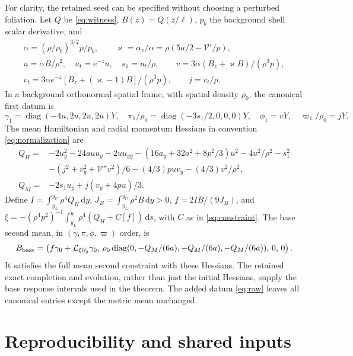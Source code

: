 \documentclass[11pt]{article}
\newcommand{\dd}{\mathrm d}
\newcommand{\Lie}{\mathcal L}
\newcommand{\cV}{\mathcal V}
\begin{document}
For clarity, the retained seed can be specified without choosing a
perturbed foliation. Let $Q$ be \eqref{eq:witness}, $B(z)=Q(z/\ell)$,
$p_b$ the background shell scalar derivative, and
\begin{gather}
 \alpha=(\rho/\rho_b)^{3/2}p/p_b,\qquad
 \varkappa=\alpha_z/\alpha=\rho(5a/2-\cV'/p),\nonumber\\
 u=\alpha B/\rho^2,\quad u_t=e^{-z}u,\quad s_1=u_t/\rho,\qquad
 v=3\alpha(B_z+\varkappa B)/(\rho^3p),\nonumber\\
 v_t=3\alpha e^{-z}[B_z+(\varkappa-1)B]/(\rho^3p),\qquad j=v_t/\rho.
 \label{eq:seed}
\end{gather}
In a background orthonormal spatial frame, with spatial density $\rho_0$,
the canonical first datum is
\begin{equation}
 \gamma_1=\operatorname{diag}(-4u,2u,2u,2u)Y,\quad
 \pi_1/\rho_0=\operatorname{diag}(-3s_1/2,0,0,0)Y,\quad
 \phi_1=vY,\quad\varpi_1/\rho_0=jY.
 \label{eq:canonicalseed}
\end{equation}
The mean Hamiltonian and radial momentum Hessians in convention
\eqref{eq:normalization} are
\begin{align}
 Q_H={}&-2u_y^2-24auu_y-2uu_{yy}
 -(16a_y+32a^2+8p^2/3)u^2-4u^2/\rho^2-s_1^2\nonumber\\
 &-(j^2+v_y^2+\cV''v^2)/6-(4/3)puv_y-(4/3)v^2/\rho^2,\nonumber\\
 Q_M={}&-2s_1u_y+j(v_y+4pu)/3.
 \label{eq:hessians}
\end{align}
Define $I=\int_{y_L}^{y_U}\rho^4Q_H\,\dd y$,
$J_B=\int_{y_L}^{y_U}\rho^2B\,\dd y>0$, $f=2IB/(9J_B)$, and
$\xi=-(\rho^4p^2)^{-1}\int_{y_L}^y\rho^4(Q_H+C[f])\,\dd s$, with
$C$ as in \eqref{eq:constraint}. The base second mean, in
$(\gamma,\pi,\phi,\varpi)$ order, is
\begin{equation}
 B_{\rm base}=\left(f\gamma_0+\Lie_{\xi\partial_y}\gamma_0,\,
 \rho_0\operatorname{diag}(0,-Q_M/(6a),-Q_M/(6a),-Q_M/(6a)),\,0,\,0\right).
 \label{eq:base}
\end{equation}
It satisfies the full mean second constraint with these Hessians.
The retained exact completion and evolution, rather than just the
initial Hessians, supply the base response intervals used in the theorem.
The added datum \eqref{eq:raw} leaves all canonical entries except the
metric mean unchanged.

\section{Reproducibility and shared inputs}
\end{document}
